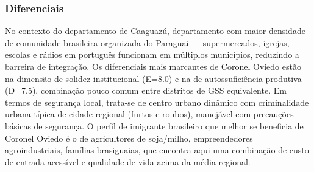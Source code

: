 \subsubsection*{Diferenciais}\label{dif-coronel-oviedo-0501}
No contexto do departamento de Caaguazú, departamento com maior densidade de comunidade brasileira organizada do Paraguai — supermercados, igrejas, escolas e rádios em português funcionam em múltiplos municípios, reduzindo a barreira de integração. Os diferenciais mais marcantes de Coronel Oviedo estão na dimensão de solidez institucional (E=8.0) e na de autossuficiência produtiva (D=7.5), combinação pouco comum entre distritos de GSS equivalente. Em termos de segurança local, trata-se de centro urbano dinâmico com criminalidade urbana típica de cidade regional (furtos e roubos), manejável com precauções básicas de segurança. O perfil de imigrante brasileiro que melhor se beneficia de Coronel Oviedo é o de agricultores de soja/milho, empreendedores agroindustriais, famílias brasiguaias, que encontra aqui uma combinação de custo de entrada acessível e qualidade de vida acima da média regional.
